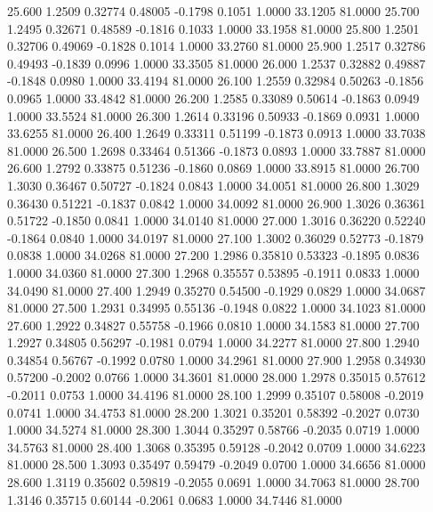   25.600   1.2509   0.32774   0.48005  -0.1798   0.1051   1.0000  33.1205  81.0000
  25.700   1.2495   0.32671   0.48589  -0.1816   0.1033   1.0000  33.1958  81.0000
  25.800   1.2501   0.32706   0.49069  -0.1828   0.1014   1.0000  33.2760  81.0000
  25.900   1.2517   0.32786   0.49493  -0.1839   0.0996   1.0000  33.3505  81.0000
  26.000   1.2537   0.32882   0.49887  -0.1848   0.0980   1.0000  33.4194  81.0000
  26.100   1.2559   0.32984   0.50263  -0.1856   0.0965   1.0000  33.4842  81.0000
  26.200   1.2585   0.33089   0.50614  -0.1863   0.0949   1.0000  33.5524  81.0000
  26.300   1.2614   0.33196   0.50933  -0.1869   0.0931   1.0000  33.6255  81.0000
  26.400   1.2649   0.33311   0.51199  -0.1873   0.0913   1.0000  33.7038  81.0000
  26.500   1.2698   0.33464   0.51366  -0.1873   0.0893   1.0000  33.7887  81.0000
  26.600   1.2792   0.33875   0.51236  -0.1860   0.0869   1.0000  33.8915  81.0000
  26.700   1.3030   0.36467   0.50727  -0.1824   0.0843   1.0000  34.0051  81.0000
  26.800   1.3029   0.36430   0.51221  -0.1837   0.0842   1.0000  34.0092  81.0000
  26.900   1.3026   0.36361   0.51722  -0.1850   0.0841   1.0000  34.0140  81.0000
  27.000   1.3016   0.36220   0.52240  -0.1864   0.0840   1.0000  34.0197  81.0000
  27.100   1.3002   0.36029   0.52773  -0.1879   0.0838   1.0000  34.0268  81.0000
  27.200   1.2986   0.35810   0.53323  -0.1895   0.0836   1.0000  34.0360  81.0000
  27.300   1.2968   0.35557   0.53895  -0.1911   0.0833   1.0000  34.0490  81.0000
  27.400   1.2949   0.35270   0.54500  -0.1929   0.0829   1.0000  34.0687  81.0000
  27.500   1.2931   0.34995   0.55136  -0.1948   0.0822   1.0000  34.1023  81.0000
  27.600   1.2922   0.34827   0.55758  -0.1966   0.0810   1.0000  34.1583  81.0000
  27.700   1.2927   0.34805   0.56297  -0.1981   0.0794   1.0000  34.2277  81.0000
  27.800   1.2940   0.34854   0.56767  -0.1992   0.0780   1.0000  34.2961  81.0000
  27.900   1.2958   0.34930   0.57200  -0.2002   0.0766   1.0000  34.3601  81.0000
  28.000   1.2978   0.35015   0.57612  -0.2011   0.0753   1.0000  34.4196  81.0000
  28.100   1.2999   0.35107   0.58008  -0.2019   0.0741   1.0000  34.4753  81.0000
  28.200   1.3021   0.35201   0.58392  -0.2027   0.0730   1.0000  34.5274  81.0000
  28.300   1.3044   0.35297   0.58766  -0.2035   0.0719   1.0000  34.5763  81.0000
  28.400   1.3068   0.35395   0.59128  -0.2042   0.0709   1.0000  34.6223  81.0000
  28.500   1.3093   0.35497   0.59479  -0.2049   0.0700   1.0000  34.6656  81.0000
  28.600   1.3119   0.35602   0.59819  -0.2055   0.0691   1.0000  34.7063  81.0000
  28.700   1.3146   0.35715   0.60144  -0.2061   0.0683   1.0000  34.7446  81.0000
